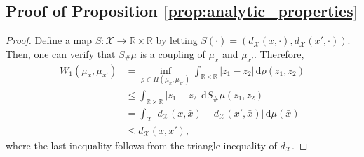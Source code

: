 \documentclass[11pt,letterpaper]{article}
\theoremstyle{definition}
\numberwithin{equation}{section}
\newcommand{\cX}{\mathcal{X}}
\newcommand{\R}{\mathbb{R}}
\begin{document}
\subsection{Proof of Proposition \ref{prop:analytic_properties}}
\begin{proof}
    Define a map $S \colon \cX \to \R \times \R$ by letting $S(\cdot) = (d_\cX(x, \cdot), d_\cX(x', \cdot))$. Then, one can verify that $S_\# \mu$ is a coupling of $\mu_x$ and $\mu_{x'}$. Therefore,
    \begin{equation*}
        \begin{split}
            W_1(\mu_x, \mu_{x'}) 
            & = \inf_{\rho \in \Pi(\mu_x, \mu_{x'})} \int_{\R \times \R} |z_1 - z_2| \, \mathrm{d} \rho(z_1, z_2) \\
            & \le \int_{\R \times \R} |z_1 - z_2| \, \mathrm{d} S_\# \mu(z_1, z_2) \\
            & = \int_{\cX} |d_\cX(x, \bar{x}) - d_\cX(x', \bar{x})| \, \mathrm{d} \mu(\bar{x}) \\
            & \le d_\cX(x, x'),
        \end{split}
    \end{equation*}
    where the last inequality follows from the triangle inequality of $d_\cX$. 
\end{proof}
\end{document}
